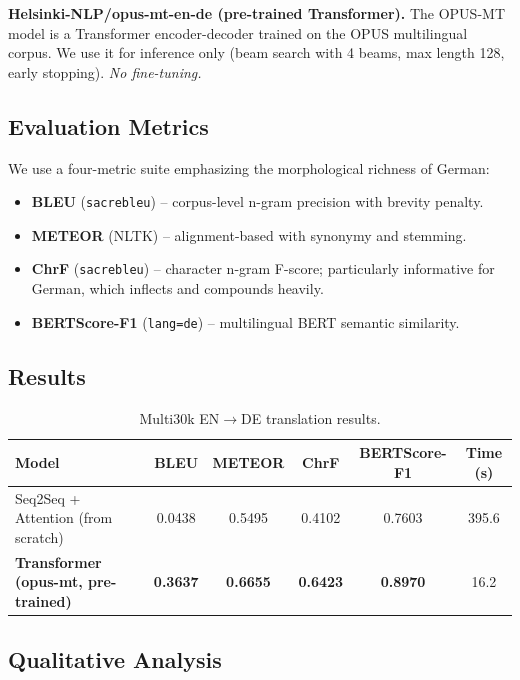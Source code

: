 \documentclass[11pt,a4paper]{article}
\begin{document}
\textbf{Helsinki-NLP/opus-mt-en-de (pre-trained Transformer).} The OPUS-MT model is a Transformer encoder-decoder trained on the OPUS multilingual corpus. We use it for inference only (beam search with 4 beams, max length 128, early stopping). \emph{No fine-tuning.}

\subsection{Evaluation Metrics}

We use a four-metric suite emphasizing the morphological richness of German:
\vspace{-0.3em}
\begin{itemize}[noitemsep,leftmargin=1.4em]
    \item \textbf{BLEU} (\texttt{sacrebleu}) -- corpus-level n-gram precision with brevity penalty.
    \item \textbf{METEOR} (NLTK) -- alignment-based with synonymy and stemming.
    \item \textbf{ChrF} (\texttt{sacrebleu}) -- character n-gram F-score; particularly informative for German, which inflects and compounds heavily.
    \item \textbf{BERTScore-F1} (\texttt{lang=de}) -- multilingual BERT semantic similarity.
\end{itemize}

\subsection{Results}

\begin{table}[h!]
\centering
\small
\caption{Multi30k EN$\to$DE translation results.}
\begin{tabular}{lccccc}
\toprule
\textbf{Model} & \textbf{BLEU} & \textbf{METEOR} & \textbf{ChrF} & \textbf{BERTScore-F1} & \textbf{Time (s)}\\
\midrule
Seq2Seq + Attention (from scratch)        & 0.0438 & 0.5495 & 0.4102 & 0.7603 & 395.6\\
\textbf{Transformer (opus-mt, pre-trained)} & \textbf{0.3637} & \textbf{0.6655} & \textbf{0.6423} & \textbf{0.8970} & 16.2\\
\bottomrule
\end{tabular}
\end{table}

\subsection{Qualitative Analysis}
\end{document}
